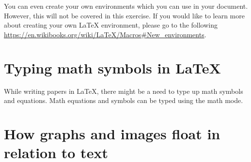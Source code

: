 \documentclass{article}            %
\begin{document}
You can even create your own environments which you can use in your document. However, this will not be covered in this exercise. If you would like to learn more about creating your own {\LaTeX} environment, please go to the following \url{https://en.wikibooks.org/wiki/LaTeX/Macros#New_environments}.

\section*{Typing math symbols in {\LaTeX}}
While writing papers in {\LaTeX}, there might be a need to type up math symbols and equations. Math equations and symbols can be typed using the math mode. 

\section*{How graphs and images float in relation to text}
\end{document}
